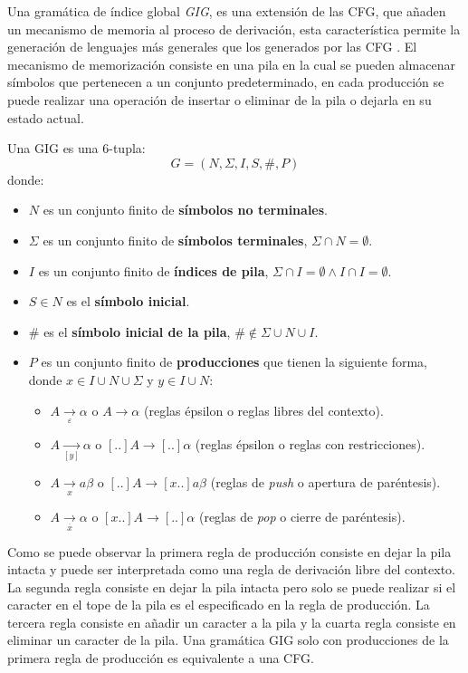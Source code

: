 Una gramática de índice global \textit{GIG}, es una extensión de las CFG, que añaden un mecanismo
de memoria al proceso de derivación, esta característica permite la generación de lenguajes más generales que los generados
por las CFG \cite{globalIndexLanguages}.
El mecanismo de memorización consiste en una pila en la cual se pueden almacenar símbolos que pertenecen a un conjunto predeterminado,
en cada producción se puede realizar una operación de insertar o eliminar de la pila o dejarla en su estado actual.

Una GIG es una 6-tupla:
$$
      G = (N, \Sigma, I, S, \#, P)
$$
donde:

\begin{itemize}
      \item $N$ es un conjunto finito de \textbf{símbolos no terminales}.
      \item \( \Sigma \) es un conjunto finito de \textbf{símbolos terminales}, $\Sigma \cap N=\emptyset$.
      \item $I$ es un conjunto finito de \textbf{índices de pila}, $\Sigma \cap I=\emptyset \wedge I \cap I=\emptyset$.
      \item $S\in N$ es el \textbf{símbolo inicial}.
      \item $\#$ es el \textbf{símbolo inicial de la pila}, $\# \notin \Sigma \cup N \cup I$.
      \item $P$ es un conjunto finito de \textbf{producciones} que tienen la siguiente forma, donde $x\in I\cup N\cup \Sigma$ y $y\in I\cup N$:
            \begin{itemize}
                  \item $A \underset{\varepsilon}{\to} \alpha$ o $A \to \alpha$ (reglas épsilon o reglas libres del contexto).
                  \item $A \underset{[y]}{\to}  \alpha$ o $[..]A \to [..]\alpha$ (reglas épsilon o reglas con restricciones).
                  \item $A \underset{x}{\to} a \beta$ o $[..]A \to  [x..]a\beta$ (reglas de \textit{push} o apertura de paréntesis).
                  \item $A \underset{\overline{x}}{\to} \alpha$ o $[x..]A \to [..]\alpha$ (reglas de \textit{pop} o cierre de paréntesis).
            \end{itemize}
\end{itemize}

Como se puede observar la primera regla de producción consiste en dejar la pila intacta y puede ser interpretada como una regla de derivación
libre del contexto. La segunda regla consiste en dejar la pila intacta pero solo se puede realizar si el caracter en el tope de la pila es el
especificado en la regla de producción. La tercera regla consiste en añadir un caracter a la pila y la cuarta regla consiste en eliminar un caracter de la pila.
Una gramática GIG solo con producciones de la primera regla de producción es equivalente a una CFG.

